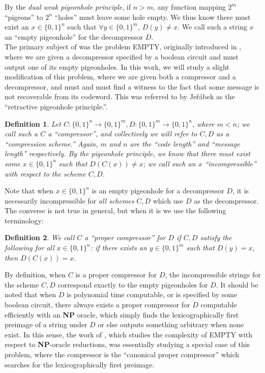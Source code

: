 \documentclass[11pt]{article}
\newtheorem{definition}{Definition}
\newcommand{\B}{\{0,1\}}
\newcommand{\Jer}{Je\v{r}\'{a}bek }
\def\cl{\bf}
\begin{document}
By the \emph{dual weak pigeonhole principle}, if $n > m$, any function mapping $2^m$ ``pigeons'' to $2^n$ ``holes'' must leave some hole empty. We thus know there must exist an $x \in \B^n$ such that $\forall y \in \B^m$, $D(y) \neq x$. We call such a string $x$ an ``empty pigeonhole'' for the decompressor $D$.\\
The primary subject of \cite{Korten} was the problem {\sc EMPTY}, originally introduced in \cite{total}, where we are given a decompressor specified by a boolean circuit and must output one of its empty pigeonholes. In this work, we will study a slight modification of this problem, where we are given both a compressor and a decompressor, and must and must find a witness to the fact that some message is not recoverable from its codeword. This was referred to by \Jer as the ``retractive pigeonhole principle.''\cite{wph-classes}.

\begin{definition}
Let $C\colon\B^n\rightarrow \B^m, D\colon \B^m \rightarrow \B^n$, where $m< n$; we call such a $C$ a ``compressor'', and collectively we will refer to $C,D$ as a ``compression scheme.'' Again, $m$ and $n$ are the ``code length'' and ``message length'' respectively. By the pigeonhole principle, we know that there must exist some $x \in \B^n$ such that $D(C(x)) \neq x$; we call such an $x$ ``incompressible'' with respect to the scheme $C,D$.
\end{definition}

Note that when $x \in \B^n$ is an empty pigeonhole for a decompressor $D$, it is necessarily incompressible for \emph{all schemes} $C,D$ which use $D$ as the decompressor. The converse is not true in general, but when it is we use the following terminology:
\begin{definition}
We call $C$ a ``proper compressor'' for $D$ if $C,D$ satisfy the following for all $x \in \B^n$: if there exists an $y \in \B^m$ such that $D(y)=x$, then $D(C(x)) = x$. 
\end{definition}
By definition, when $C$ is a proper compressor for $D$, the incompressible strings for the scheme $C,D$ correspond exactly to the empty pigeonholes for $D$.  It should be noted that when $D$ is polynomial time computable, or is specified by some boolean circuit, there always exists a proper compressor for $D$ computable efficiently with an {\cl NP} oracle, which simply finds the lexicographically first preimage of a string under $D$ or else outputs something arbitrary when none exist. In this sense, the work of \cite{Korten}, which studies the complexity of {\sc EMPTY} with respect to {\cl NP}-oracle reductions, was essentially studying a special case of this problem, where the compressor is the ``canonical proper compressor'' which searches for the lexicographically first preimage.
\end{document}
